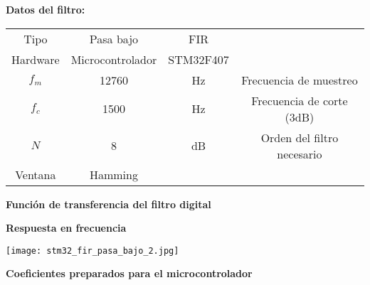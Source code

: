 \documentclass[informe.tex]{subfiles}
\begin{document}
\textbf{Datos del filtro:}\newline	
								
	\begin{tabular}{ |c | c| c| c|}
		\hline
			 Tipo     & Pasa bajo & FIR & \\
 			 Hardware & Microcontrolador & STM32F407 & \\			 
			$ f_m $  & 12760  & Hz & Frecuencia de muestreo \\
			$ f_c $  & 1500  & Hz & Frecuencia de corte (3dB) \\
			$ N $   & 8  & dB & Orden del filtro necesario \\			
			Ventana    & Hamming  & & \\
		\hline
	\end{tabular}\newline\newline		
	
\textbf{Función de transferencia del filtro digital}\newline

	\begin{tiny}
		
	\end{tiny}\newline
	
\textbf{Respuesta en frecuencia}\newline
	
	\texttt{[image: stm32\_fir\_pasa\_bajo\_2.jpg]}
			
\textbf{Coeficientes preparados para el microcontrolador}\newline


\end{document}
